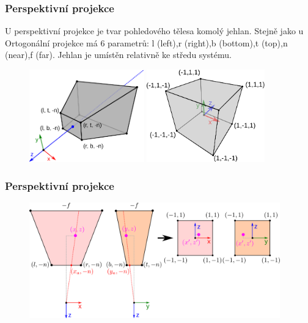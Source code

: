 \begin{frame}
\frametitle{Perspektivní projekce}
U perspektivní projekce je tvar pohledového tělesa komolý jehlan.
Stejně jako u Ortogonální projekce má 6 parametrů: l (left),r (right),b (bottom),t (top),n (near),f (far).
Jehlan je umístěn relativně ke středu systému.
\begin{figure}[htb]
	\includegraphics[height=4cm,keepaspectratio]{pics/projection/pers}
	\includegraphics[height=4cm,keepaspectratio]{pics/projection/ndc}
\end{figure}
\end{frame}

\begin{frame}
\frametitle{Perspektivní projekce}
\begin{figure}[htb]
	\includegraphics[height=5cm,keepaspectratio]{pics/projection/frompers}
\end{figure}
\end{frame}

